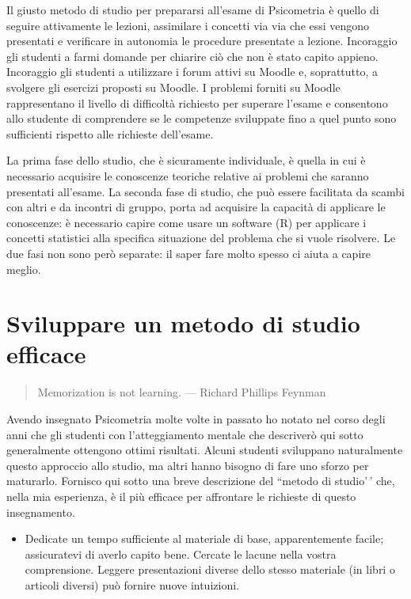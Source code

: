 \documentclass[
  11pt,
  italian,
  a4paper,
  extrafontsizes,onecolumn,openright
  ]{memoir}
\providecommand{\tightlist}{%
  \setlength{\itemsep}{0pt}\setlength{\parskip}{0pt}}
\newcommand{\R}{\textsf{R}} %
\theoremstyle{definition}
\theoremstyle{definition}
\theoremstyle{definition}
\theoremstyle{definition}
\theoremstyle{remark}
\begin{document}
Il giusto metodo di studio per prepararsi all'esame di Psicometria è quello di seguire attivamente le lezioni, assimilare i concetti via via che essi vengono presentati e verificare in autonomia le procedure presentate a lezione. Incoraggio gli studenti a farmi domande per chiarire ciò che non è stato capito appieno. Incoraggio gli studenti a utilizzare i forum attivi su Moodle e, soprattutto, a svolgere gli esercizi proposti su Moodle. I problemi forniti su Moodle rappresentano il livello di difficoltà richiesto per superare l'esame e consentono allo studente di comprendere se le competenze sviluppate fino a quel punto sono sufficienti rispetto alle richieste dell'esame.

La prima fase dello studio, che è sicuramente individuale, è quella in cui è necessario acquisire le conoscenze teoriche relative ai problemi che saranno presentati all'esame. La seconda fase di studio, che può essere facilitata da scambi con altri e da incontri di gruppo, porta ad acquisire la capacità di applicare le conoscenze: è necessario capire come usare un software (\R) per applicare i concetti statistici alla specifica situazione del problema che si vuole risolvere. Le due fasi non sono però separate: il saper fare molto spesso ci aiuta a capire meglio.

\hypertarget{sviluppare-un-metodo-di-studio-efficace}{%
\section*{Sviluppare un metodo di studio efficace}\label{sviluppare-un-metodo-di-studio-efficace}}

\begin{quote}
Memorization is not learning. --- Richard Phillips Feynman
\end{quote}

Avendo insegnato Psicometria molte volte in passato ho notato nel corso degli anni che gli studenti con l'atteggiamento mentale che descriverò qui sotto generalmente ottengono ottimi risultati. Alcuni studenti sviluppano naturalmente questo approccio allo studio, ma altri hanno bisogno di fare uno sforzo per maturarlo. Fornisco qui sotto una breve descrizione del ``metodo di studio'\,' che, nella mia esperienza, è il più efficace per affrontare le richieste di questo insegnamento.

\begin{itemize}
\tightlist
\item
  Dedicate un tempo sufficiente al materiale di base, apparentemente facile; assicuratevi di averlo capito bene. Cercate le lacune nella vostra comprensione. Leggere presentazioni diverse dello stesso materiale (in libri o articoli diversi) può fornire nuove intuizioni.
\end{itemize}
\end{document}
